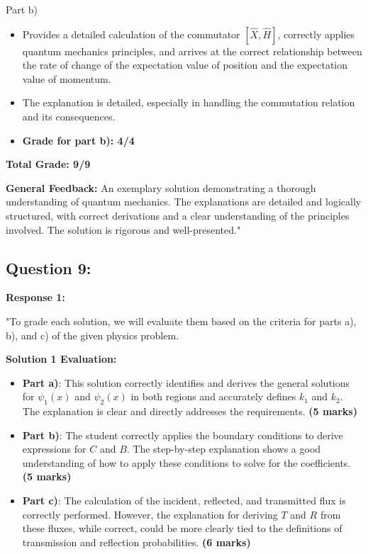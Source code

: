 \documentclass[a4paper,11pt]{article}
\begin{document}
Part b)

\begin{itemize}
    \item Provides a detailed calculation of the commutator \(\left[ \hat{X}, \hat{H}\right]\), correctly applies quantum mechanics principles, and arrives at the correct relationship between the rate of change of the expectation value of position and the expectation value of momentum.
    \item The explanation is detailed, especially in handling the commutation relation and its consequences.
    \item \textbf{Grade for part b): 4/4}
\end{itemize}

\textbf{Total Grade: 9/9}

\textbf{General Feedback:}
An exemplary solution demonstrating a thorough understanding of quantum mechanics. The explanations are detailed and logically structured, with correct derivations and a clear understanding of the principles involved. The solution is rigorous and well-presented."

\subsection*{Question 9:}

\textbf{Response 1:}

"To grade each solution, we will evaluate them based on the criteria for parts a), b), and c) of the given physics problem. 

\textbf{Solution 1 Evaluation:}

\begin{itemize}
    \item \textbf{Part a)}: This solution correctly identifies and derives the general solutions for \(\psi_1(x)\) and \(\psi_2(x)\) in both regions and accurately defines \(k_1\) and \(k_2\). The explanation is clear and directly addresses the requirements. \textbf{(5 marks)}
    \item \textbf{Part b)}: The student correctly applies the boundary conditions to derive expressions for \(C\) and \(B\). The step-by-step explanation shows a good understanding of how to apply these conditions to solve for the coefficients. \textbf{(5 marks)}
    \item \textbf{Part c)}: The calculation of the incident, reflected, and transmitted flux is correctly performed. However, the explanation for deriving \(T\) and \(R\) from these fluxes, while correct, could be more clearly tied to the definitions of transmission and reflection probabilities. \textbf{(6 marks)}
\end{itemize}
\end{document}
